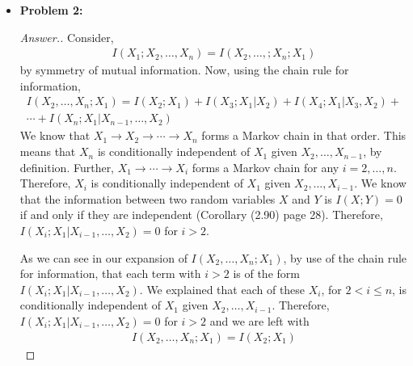 \documentclass[10pt,twoside]{article}
\begin{document}
\begin{itemize}
\begin{enumerate}
    \item\begin{proof}[Answer.]

    $H(Z) = H(X) + H(Y)$ when the entropy of $Y$ given $Z$ or the entropy of $X$ given $Z$ is exactly $0$ and $X,Y$ are independent. This conclusion was made form our calculation in (a.).
        
    \end{proof}
    
    \end{enumerate}

    \newpage
    
    \item\textbf{Problem 2:} \newline
    \noindent\makebox[\linewidth]{\rule{18cm}{0.4pt}}
    
    \begin{proof}[Answer.]
    Consider, 
    \begin{gather*}
        I(X_1;X_2,\ldots, X_n) = I(X_2,\ldots, ;X_n;X_1)
    \end{gather*}
    by symmetry of mutual information. Now, using the chain rule for information,
    \begin{gather*}
        I(X_2,\ldots, X_n;X_1) = I(X_2;X_1) + I(X_3;X_1|X_2) + I(X_4;X_1|X_3, X_2) +  \\
        \cdots + I(X_n;X_1|X_{n-1},\ldots, X_2)
    \end{gather*}
    We know that $X_1\rightarrow X_2\rightarrow\cdots \rightarrow X_n$ forms a Markov chain in that order. This means that $X_n$ is conditionally independent of $X_1$ given $X_2,\ldots, X_{n-1}$, by definition. Further, $X_1\rightarrow\cdots \rightarrow X_i$ forms a Markov chain for any $i = 2,\ldots, n$. Therefore, $X_i$ is conditionally independent of $X_1$ given $X_2,\ldots, X_{i-1}$. We know that the information between two random variables $X$ and $Y$ is $I(X;Y) = 0$ if and only if they are independent (Corollary (2.90) page 28). Therefore, $I(X_i;X_1|X_{i-1},\ldots, X_2) = 0$ for $i>2$.

    As we can see in our expansion of $I(X_2,\ldots, X_n;X_1)$, by use of the chain rule for information, that each term with $i>2$ is of the form $I(X_i;X_1|X_{i-1},\ldots, X_2)$. We explained that each of these $X_i$, for $2<i\leq n$, is conditionally independent of $X_1$ given $X_2,\ldots, X_{i-1}$. Therefore, $I(X_i;X_1|X_{i-1},\ldots, X_2) = 0$ for $i>2$ and we are left with
    \begin{gather*}
        I(X_2,\ldots, X_n;X_1) = I(X_2;X_1)
    \end{gather*}
    

\end{proof}
\end{itemize}
\end{document}
